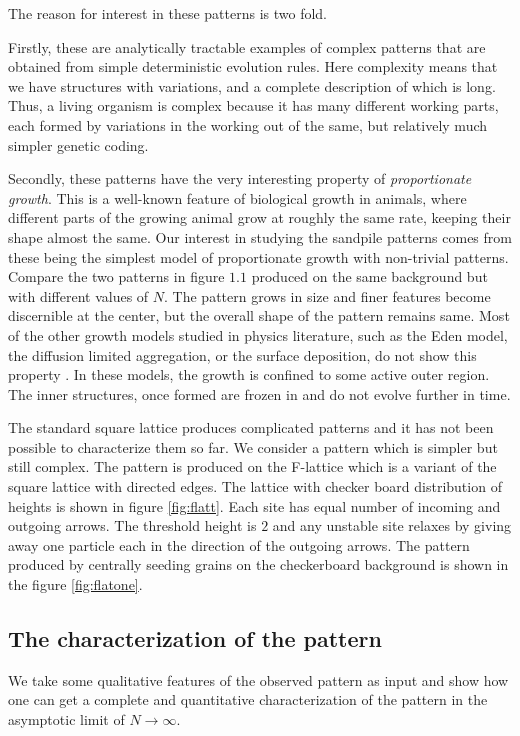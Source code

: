 \documentclass[11pt,a4paper]{book}
\begin{document}
The reason for interest in these patterns is two fold.

Firstly, these are analytically tractable examples of complex patterns that are obtained from simple
deterministic evolution rules. Here complexity means that we have
structures with variations, and a complete description of which is
long. Thus, a living organism is complex because it has many different
working parts, each formed by variations in the working out of the
same, but relatively much simpler genetic coding.

Secondly, these patterns have the very interesting property of
\textit{proportionate growth}. This is a well-known feature of
biological growth in animals, where different parts of the growing
animal grow at roughly the same rate, keeping their shape almost the
same. Our
interest in studying the sandpile patterns comes from these being the
simplest model of proportionate growth with non-trivial patterns. Compare the two patterns in figure
$1.1$ produced on
the same background but with different values of $N$. The pattern
grows in size and finer features become discernible at the center, but the overall shape of
the pattern remains same. Most of the other growth models studied in physics
literature, such as the Eden model, the diffusion limited aggregation,
or the surface
deposition, do not show this property \cite{eden,dla,barabasi}. In these
models, the growth is
confined to some active outer region. The inner structures, once
formed are frozen in and do not evolve further in time.

The standard square lattice produces complicated patterns and it has
not been possible to characterize them so far. We consider a pattern which is simpler but
still complex. The pattern is produced on the F-lattice which is a
variant of the square lattice with directed edges. The lattice with
checker board distribution of heights is shown in figure
\ref{fig:flatt}. Each site has
equal number of incoming and outgoing arrows. The threshold height is
$2$ and any unstable site relaxes by giving away one particle each in
the direction of the outgoing arrows. The pattern produced by
centrally seeding grains on the checkerboard background is shown in
the figure \ref{fig:flatone}.

\subsection{The characterization of the pattern}
We take some qualitative features of the observed pattern as input
and show how one can get a complete and quantitative characterization
of the pattern in the asymptotic limit of $N\rightarrow \infty$.
\end{document}
